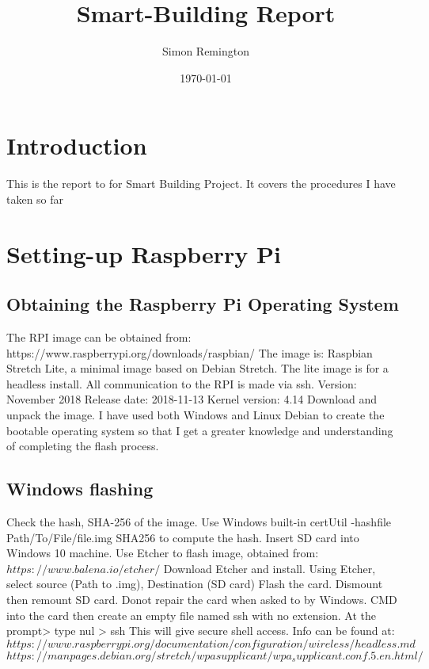 \documentclass[a4paper,12pt]{article}
\begin{document}
	\pagestyle{empty}%
\title{Smart-Building Report}
\author{Simon Remington}
\date{\today}
\maketitle
\newpage
\tableofcontents
\newpage
\section{Introduction}
This is the report to for Smart Building Project. It covers the procedures I have taken so far
\section{Setting-up Raspberry Pi}
\subsection{Obtaining the Raspberry Pi Operating System}
The RPI image can be obtained from:
\newline
https://www.raspberrypi.org/downloads/raspbian/
\newline
The image is:
Raspbian Stretch Lite, a minimal image based on Debian Stretch.
The lite image is for a headless install. All communication to the RPI is made via ssh.
\newline
Version: November 2018
\newline
Release date: 2018-11-13
\newline
Kernel version: 4.14 
\newline
Download and unpack the image.
\newline
I have used both Windows and Linux Debian to create the bootable operating system so that I get a greater knowledge and understanding of completing the flash process.
\subsection{Windows flashing}
Check the hash, SHA-256 of the image.
\newline
Use Windows built-in certUtil -hashfile Path/To/File/file.img SHA256 to compute the hash.
\newline
Insert SD card into Windows 10 machine.
\newline
Use Etcher to flash image, obtained from:
\newline
$https://www.balena.io/etcher/$
\newline
Download Etcher and install.
\newline
Using Etcher, select source (Path to  .img), Destination (SD card)
Flash the card.
Dismount then remount SD card.
Donot repair the card when asked to by Windows.
CMD into the card then create an empty file named ssh with no extension.
\newline
At the prompt>  type nul > ssh
\newline
This will give secure shell access. Info can be found at:
\newline
$https://www.raspberrypi.org/documentation/configuration/wireless/headless.md
$
\newline $https://manpages.debian.org/stretch/wpasupplicant/wpa_supplicant.conf.5.en.html/
$
\end{document}
